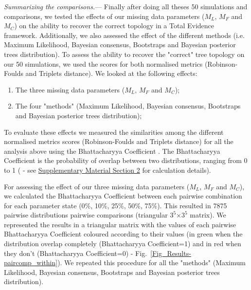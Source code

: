 \documentclass[12pt,letterpaper]{article}
\renewcommand{\subsubsection}[1]{%
\vspace{2ex}
\noindent
\textit{#1.}---}
\begin{document}
\subsubsection{Summarizing the comparisons}
Finally after doing all theses %
50 simulations and comparisons, we tested the effects of our missing data parameters ($M_{L}$, $M_{F}$ and $M_{C}$) on the ability to recover the correct topology in a Total Evidence framework. Additionally, we also assessed the effect of the different methods (i.e. Maximum Likelihood, Bayesian consensus, Bootstraps and Bayesian posterior trees distribution).%
 To assess the ability to recover the "correct" tree topology on our 50 simulations, we used the scores for both normalised metrics (Robinson-Foulds and Triplets distance). We looked at the following effects:
\begin{enumerate}
\item{The three missing data parameters ($M_{L}$, $M_{F}$ and $M_{C}$);}
\item{The four "methods" (Maximum Likelihood, Bayesian consensus, Bootstraps and Bayesian posterior trees distribution);}
\end{enumerate}

To evaluate these effects we measured the similarities among the different normalised metrics scores (Robinson-Foulds and Triplets distance) for all the analysis above using the Bhattacharyya Coefficient \citep{Bhattacharyya}. The Bhattacharyya Coefficient is the probability of overlap between two distributions, ranging from 0 to 1 (\citealt{Bhattacharyya} - see \hyperref[SupplementaryMaterial]{Supplementary Material Section 2} for calculation details).

For assessing the effect of our three missing data parameters ($M_{L}$, $M_{F}$ and $M_{C}$), we calculated the Bhattacharyya Coefficient between each pairwise combination for each parameter state (0\%, 10\%, 25\%, 50\%, 75\%). This resulted in 7875 pairwise distributions pairwise comparisons (triangular $3^5$$\times$$3^5$ matrix). We represented the results in a triangular matrix with the values of each pairwise Bhattacharyya Coefficient coloured according to their values (in green when the distribution overlap completely (Bhattacharyya Coefficient=1) and in red when they don't (Bhattacharyya Coefficient=0) - Fig.~\ref{Fig_Results-paircomp_within}). We repeated this procedure for all the "methods" (Maximum Likelihood, Bayesian consensus, Bootstraps and Bayesian posterior trees distribution).
\end{document}

